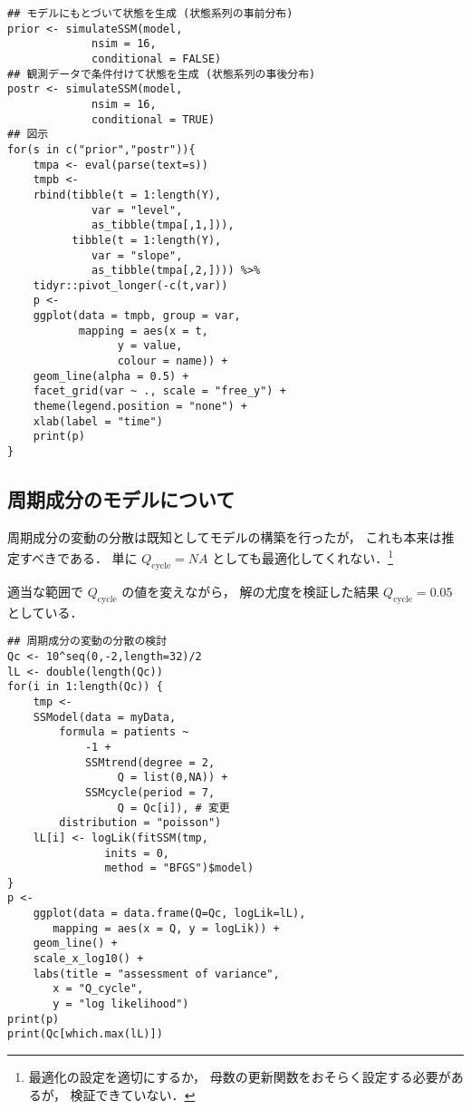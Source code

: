 \documentclass[10pt,oneside,fleqn]{scrartcl}
\begin{document}
\begin{figure*}[htbp]
  \centering
\end{figure*}

\begin{verbatim}
## モデルにもとづいて状態を生成 (状態系列の事前分布)
prior <- simulateSSM(model,
		     nsim = 16,
		     conditional = FALSE)
## 観測データで条件付けて状態を生成 (状態系列の事後分布)
postr <- simulateSSM(model,
		     nsim = 16,
		     conditional = TRUE)
## 図示
for(s in c("prior","postr")){
    tmpa <- eval(parse(text=s))
    tmpb <- 
	rbind(tibble(t = 1:length(Y),
		     var = "level",
		     as_tibble(tmpa[,1,])),
	      tibble(t = 1:length(Y),
		     var = "slope",
		     as_tibble(tmpa[,2,]))) %>%
	tidyr::pivot_longer(-c(t,var)) 
    p <- 
	ggplot(data = tmpb, group = var,
	       mapping = aes(x = t,
			     y = value,
			     colour = name)) +
	geom_line(alpha = 0.5) +
	facet_grid(var ~ ., scale = "free_y") +
	theme(legend.position = "none") +
	xlab(label = "time")
    print(p)
}
\end{verbatim}

\subsection{周期成分のモデルについて}
\label{sec:orgc7aa469}

周期成分の変動の分散は既知としてモデルの構築を行ったが，
これも本来は推定すべきである．
単に \(Q_{\mathrm{cycle}}=NA\)
としても最適化してくれない．\footnote{最適化の設定を適切にするか，
母数の更新関数をおそらく設定する必要があるが，
検証できていない．}

適当な範囲で \(Q_{\mathrm{cycle}}\) の値を変えながら，
解の尤度を検証した結果 \(Q_{\mathrm{cycle}}=0.05\) としている．

\begin{figure}[htbp]
  \centering
  \myGraph*{}
\end{figure}

\begin{verbatim}
## 周期成分の変動の分散の検討
Qc <- 10^seq(0,-2,length=32)/2
lL <- double(length(Qc))
for(i in 1:length(Qc)) {
    tmp <-
	SSModel(data = myData, 
		formula = patients ~ 
		    -1 + 
		    SSMtrend(degree = 2, 
			     Q = list(0,NA)) +
		    SSMcycle(period = 7, 
			     Q = Qc[i]), # 変更
		distribution = "poisson") 
    lL[i] <- logLik(fitSSM(tmp,
			   inits = 0,
			   method = "BFGS")$model)
}
p <-
    ggplot(data = data.frame(Q=Qc, logLik=lL),
	   mapping = aes(x = Q, y = logLik)) +
    geom_line() +
    scale_x_log10() +
    labs(title = "assessment of variance",
       x = "Q_cycle",
       y = "log likelihood")
print(p)
print(Qc[which.max(lL)])
\end{verbatim}
\end{document}
